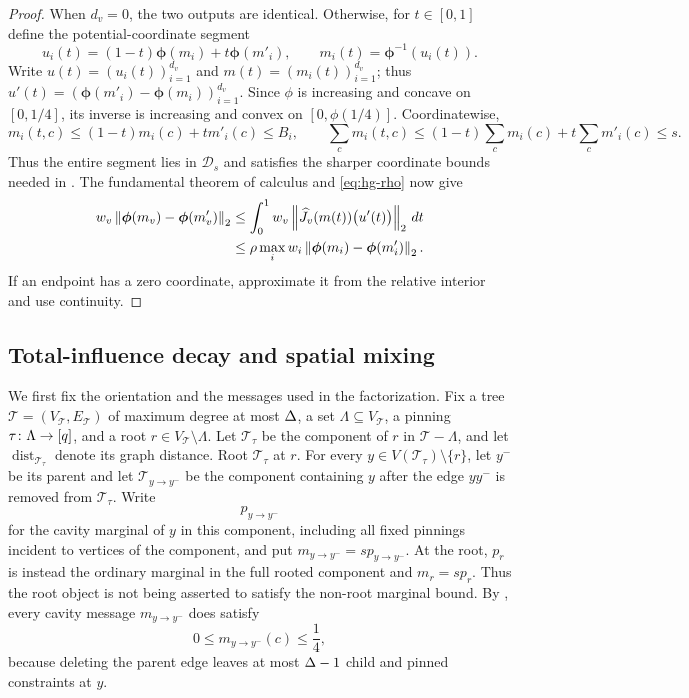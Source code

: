 \begin{proof}
When $d_v=0$, the two outputs are identical.  Otherwise, for
$t\in[0,1]$ define the potential-coordinate segment
\[
 u_i(t)=(1-t)\boldsymbol\phi(m_i)+t\boldsymbol\phi(m'_i),
 \qquad
 m_i(t)=\boldsymbol\phi^{-1}(u_i(t)).
\]
Write \(u(t)=(u_i(t))_{i=1}^{d_v}\) and
\(m(t)=(m_i(t))_{i=1}^{d_v}\); thus
\(u'(t)=(\boldsymbol\phi(m'_i)-\boldsymbol\phi(m_i))_{i=1}^{d_v}\).
Since $\phi$ is increasing and concave on $[0,1/4]$, its inverse is
increasing and convex on $[0,\phi(1/4)]$.  Coordinatewise,
\[
 m_i(t,c)
 \le (1-t)m_i(c)+tm'_i(c)\le B_i,
 \qquad
 \sum_c m_i(t,c)
 \le (1-t)\sum_c m_i(c)+t\sum_c m'_i(c)
 \le s.
\]
Thus the entire segment lies in $\mathcal D_s$ and satisfies the sharper
coordinate bounds needed in .  The fundamental
theorem of calculus and \eqref{eq:hg-rho} now give
\begin{align*}
 w_v\left\|\boldsymbol\phi(m_v)-\boldsymbol\phi(m'_v)\right\|_2
 &\le
 \int_0^1
  w_v\left\|\widehat J_v(m(t))
                \bigl(u'(t)\bigr)\right\|_2\,dt\\
 &\le
 \rho\max_iw_i\left\|\boldsymbol\phi(m_i)-\boldsymbol\phi(m'_i)\right\|_2.
\end{align*}
If an endpoint has a zero coordinate, approximate it from the relative
interior and use continuity.
\end{proof}

\subsection{Total-influence decay and spatial mixing}
\label{sec:hg-tree-consequences}

We first fix the orientation and the messages used in the factorization.
Fix a tree \(\mathcal T=(V_{\mathcal T},E_{\mathcal T})\) of maximum
degree at most \(\Delta\), a set
\(\Lambda\subseteq V_{\mathcal T}\), a pinning
\(\tau\colon\Lambda\to[q]\), and a root
\(r\in V_{\mathcal T}\setminus\Lambda\).
Let \(\mathcal T_\tau\) be the component of \(r\) in
\(\mathcal T-\Lambda\), and let
\(\operatorname{dist}_{\mathcal T_\tau}\) denote its graph distance.
Root \(\mathcal T_\tau\) at \(r\).  For every
\(y\in V(\mathcal T_\tau)\setminus\{r\}\), let \(y^-\) be its parent and
let \(\mathcal T_{y\to y^-}\) be the component containing \(y\) after
the edge \(yy^-\) is removed from \(\mathcal T_\tau\).  Write
\[
  p_{y\to y^-}
\]
for the cavity marginal of $y$ in this component, including all fixed
pinnings incident to vertices of the component, and put
$m_{y\to y^-}=sp_{y\to y^-}$.  At the root, $p_r$ is instead the
ordinary marginal in the full rooted component and $m_r=sp_r$.  Thus
the root object is not being asserted to satisfy the non-root marginal bound.
By , every cavity message
$m_{y\to y^-}$ does satisfy
\begin{equation}
  0\le m_{y\to y^-}(c)\le\frac14,
  \label{eq:hg-cavity-quarter}
\end{equation}
because deleting the parent edge leaves at most $\Delta-1$ child and pinned
constraints at $y$.

